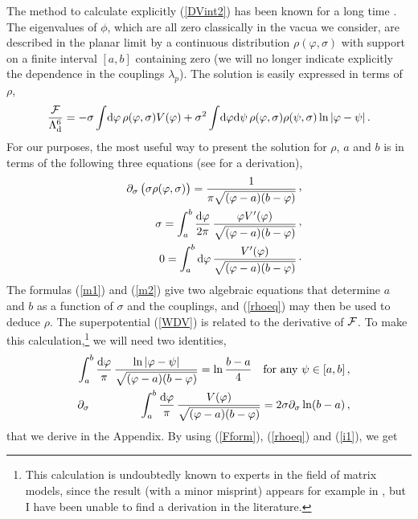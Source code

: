 \documentclass[a4paper,12pt]{article}
\def\cvp{\raise 2pt\hbox{,}}
\def\d{{\rm d}}
\begin{document}
The method to calculate explicitly (\ref{DVint2}) has been known for a long
time \cite{BIPZ,matrev}. The eigenvalues of $\phi$, which are all zero
classically in the vacua we consider, are described in the planar limit by
a continuous distribution $\rho(\varphi ,\sigma)$ with support
on a finite interval $[a,b]$ containing zero (we will no longer indicate 
explicitly the dependence in the couplings $\lambda_{p}$).
The solution is easily expressed in terms of $\rho$,
%
\begin{equation}
\label{Fform}
{{\cal F}\over \Ld^{6}} = -\sigma\int\!\d\varphi\, 
\rho(\varphi ,\sigma)V(\varphi) + \sigma^{2}\int\!\d\varphi\d\psi\, 
\rho(\varphi ,\sigma)\rho(\psi ,\sigma)\ln |\varphi -\psi |\, .
\end{equation}
%
For our purposes, the most useful way to present the solution for $\rho$, 
$a$ and $b$ is in terms of the following three equations (see
\cite{matrev} for a derivation),
%
\begin{eqnarray}
&& \partial_{\sigma} \left(\strut\sigma\rho(\varphi,\sigma)\right) = 
{1\over\pi\sqrt{(\varphi -a)(b-\varphi)}}\, \cvp \label{rhoeq}\\
&& \sigma = \int_{a}^{b} {\d\varphi\over 2\pi}\,{\varphi V'(\varphi)\over
\sqrt{(\varphi -a)(b-\varphi)}}\, \cvp\label{m1}\\
&& 0 = \int_{a}^{b}\d\varphi\, { V'(\varphi)\over
\sqrt{(\varphi -a)(b-\varphi)}}\, \cdotp\label{m2}
\end{eqnarray}
%
The formulas (\ref{m1}) and (\ref{m2}) give two algebraic equations that 
determine $a$ and $b$ as a function of $\sigma$ and the couplings,
and (\ref{rhoeq}) may then be used to deduce $\rho$.
The superpotential (\ref{WDV}) is related to the derivative of
$\cal F$. To make this calculation,\footnote{This calculation is
undoubtedly known to experts in the field of matrix 
models, since the result (with a minor misprint) appears for example
in \cite{eynard}, but I have been unable to find a derivation in the 
literature.} we will need two identities,
%
\begin{eqnarray}
&& \int_{a}^{b} {\d\varphi\over\pi}\, {\ln |\varphi -\psi|\over
\sqrt{(\varphi -a)(b-\varphi)}} = \ln {b-a\over 4}\quad {\rm for\ any}\ 
\psi\in [a,b]\, ,\label{i1}\\
 \partial_{\sigma}\hskip -.7cm&& \int_{a}^{b} {\d\varphi\over\pi}\, 
{ V(\varphi)\over\sqrt{(\varphi -a)(b-\varphi)}} =
2\sigma\partial_{\sigma}\ln (b-a)\, ,\label{i2}
\end{eqnarray}
%
that we derive in the Appendix.
By using (\ref{Fform}), (\ref{rhoeq}) and (\ref{i1}), we get
\end{document}
